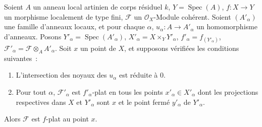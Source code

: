 \begin{proposition}[11.4.12]
\label{IV.11.4.12-fr}
Soient $A$ un anneau local artinien de corps résiduel $k$,
$Y=\operatorname{Spec}(A)$, $f:X\to Y$ un morphisme localement de type fini,
$\mathcal F$ un $\mathcal O_X$-Module cohérent. Soient $(A'_\alpha)$ une famille
d'anneaux locaux, et pour chaque $\alpha$, $u_\alpha:A\to A'_\alpha$ un
homomorphisme d'anneaux. Posons $Y'_\alpha=\operatorname{Spec}(A'_\alpha)$,
$X'_\alpha=X\times_Y Y'_\alpha$, $f'_\alpha=f_{(Y'_\alpha)}$,
$\mathcal F'_\alpha=\mathcal F\otimes_A A'_\alpha$. Soit $x$ un point de $X$,
et supposons vérifiées les conditions suivantes~:
\begin{enumerate}[label=\textup{(\roman*)}]
  \item L'intersection des noyaux des $u_\alpha$ est réduite à $0$.
  \item Pour tout $\alpha$, $\mathcal F'_\alpha$ est $f'_\alpha$-plat en \textup{tous}
  les points $x'_\alpha\in X'_\alpha$ dont les projections respectives dans
  $X$ et $Y'_\alpha$ sont $x$ et le point fermé $y'_\alpha$ de $Y'_\alpha$.
\end{enumerate}

Alors $\mathcal F$ est $f$-plat au point $x$.
\end{proposition}


